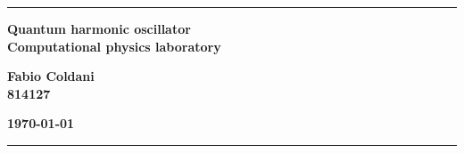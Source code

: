 \begin{titlepage}
\par\noindent\rule{\textwidth}{0.6pt}
  \begin{center}
    {\LARGE{\bf Quantum harmonic oscillator }}\\
  	\vspace{5mm}
  	\textbf{Computational physics laboratory}\\
  	\vspace{15mm}
  \end{center}
\vspace{18mm}

\begin{minipage}[t]{0.47\textwidth}
  {\large{\bf Fabio Coldani\\ 814127}}
\end{minipage}\hfill\begin{minipage}[t]{0.47\textwidth}\raggedleft
	{\large{\bf \today}}
\end{minipage}
\vspace{5mm}

\noindent\rule{\textwidth}{0.6pt}
\vspace{20mm}


\tableofcontents
\end{titlepage}


